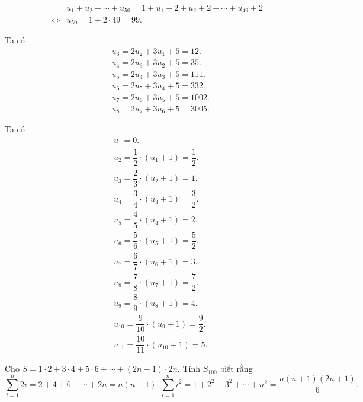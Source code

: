 \begin{ex}
{\begin{listEX}[1]
\begin{eqnarray*}
				 &&u_1+u_2+\cdots+u_{50}=1+u_1+2+u_2+2+\cdots+u_{49}+2\\
				&\Leftrightarrow& u_{50}=1+2 \cdot  49=99.
			\end{eqnarray*}
			\item Ta  có
			\begin{eqnarray*}
				 &&u_3=2u_2+3u_1+5=12. \\
				&&u_4=2u_3+3u_2+5=35.  \\
				&&u_5=2u_4+3u_3+5=111.  \\
				 &&u_6=2u_5+3u_4+5=332. \\
				&&u_7=2u_6+3u_5+5=1002.  \\
				&&u_8=2u_7+3u_6+5=3005. 
			\end{eqnarray*}
			\item Ta có 
			\begin{eqnarray*}
				 &&u_1=0. \\
				 &&u_2=\dfrac{1}{2} \cdot \left(u_1+1\right)=\dfrac{1}{2}. \\
				&&u_3=\dfrac{2}{3} \cdot  \left(u_2+1\right)=1. \\
				 &&u_4=\dfrac{3}{4} \cdot \left(u_3+1\right)=\dfrac{3}{2}. \\
				&&u_5=\dfrac{4}{5} \cdot \left(u_4+1\right)=2.  \\
				&&u_6=\dfrac{5}{6} \cdot \left(u_5+1\right)=\dfrac{5}{2}. \\ 
				&&u_7=\dfrac{6}{7} \cdot \left(u_6+1\right)=3. \\ 
				&&u_8=\dfrac{7}{8}  \cdot \left(u_7+1\right)=\dfrac{7}{2}. \\
				&&u_9=\dfrac{8}{9} \cdot \left(u_8+1\right)=4.  \\
				&&u_{10}=\dfrac{9}{10} \cdot  \left(u_9+1\right)=\dfrac{9}{2}. \\
				&&u_{11}=\dfrac{10}{11} \cdot \left(u_{10}+1\right)=5. 
			\end{eqnarray*}
		\end{listEX}
	 }
\end{ex}

\begin{ex}%
	Cho $S=1\cdot 2+3\cdot 4+5\cdot 6+\cdots+(2n-1)\cdot 2n$. Tính $S_{100}$ biết  rằng
	 \[\sum\limits_{i=1}^n 2i=2+4+6+\cdots+2n=n(n+1);\sum\limits_{i=1}^n i^2=1+2^2+3^2+\cdots+n^2=\dfrac{n(n+1)(2n+1)}{6}.\]
\end{ex}


